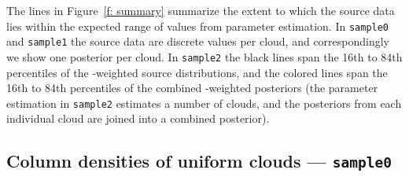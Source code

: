 \documentclass[fleqn,usenatbib]{mnras}
\begin{document}
The lines in Figure~\ref{f: summary} summarize the extent to which the source data lies within the expected range of values from parameter estimation.
In \texttt{sample0} and \texttt{sample1} the source data are discrete values per cloud,
and correspondingly we show one posterior per cloud.
In \texttt{sample2} the black lines span the 16th to 84th percentiles of the -weighted source distributions,
and the colored lines span the 16th to 84th percentiles of the combined -weighted posteriors (the parameter estimation in \texttt{sample2} estimates a number of clouds, and the posteriors from each individual cloud are joined into a combined posterior).

\subsection{Column densities of uniform clouds --- \texttt{sample0}}
\label{s: results -- sample0}

\end{document}
